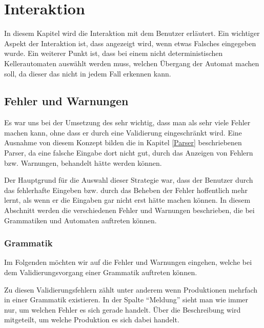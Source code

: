 



\chapter{Interaktion}\label{Interaction}

In diesem Kapitel wird die Interaktion mit dem Benutzer erläutert. Ein wichtiger
Aspekt der Interaktion ist, dass angezeigt wird, wenn etwas Falsches eingegeben
wurde. Ein weiterer Punkt ist, dass bei einem nicht deterministischen
Kellerautomaten auswählt werden muss, welchen Übergang der Automat machen soll,
da dieser das nicht in jedem Fall erkennen kann.\vspace{10pt}


\section{Fehler und Warnungen}\label{InteractionErrorWarning}

Es war uns bei der Umsetzung des \gtitools sehr wichtig, dass man als sehr viele
Fehler machen kann, ohne dass er durch eine Validierung eingeschränkt wird. Eine
Ausnahme von diesem Konzept bilden die in Kapitel \ref{Parser} beschriebenen
Parser, da eine falsche Eingabe dort nicht gut, durch das Anzeigen von Fehlern
bzw. Warnungen, behandelt hätte werden können.\vspace{10pt}

Der Hauptgrund für die Auswahl dieser Strategie war, dass der Benutzer durch das
fehlerhafte Eingeben bzw. durch das Beheben der Fehler hoffentlich mehr lernt,
als wenn er die Eingaben gar nicht erst hätte machen können. In diesem Abschnitt
werden die verschiedenen Fehler und Warnungen beschrieben, die bei Grammatiken und
Automaten auftreten können.\vspace{10pt}


\subsection{Grammatik}\label{InteractionGrammar}

Im Folgenden möchten wir auf die Fehler und Warnungen eingehen, welche bei dem
Validierungsvorgang einer Grammatik auftreten können.\vspace{10pt}

Zu diesen Validierungsfehlern zählt unter anderem wenn Produktionen mehrfach
in einer Grammatik existieren. In der Spalte "`Meldung"' sieht man wie immer
nur, um welchen Fehler es sich gerade handelt. Über die Beschreibung wird
mitgeteilt, um welche Produktion es sich dabei handelt.\vspace{10pt}

